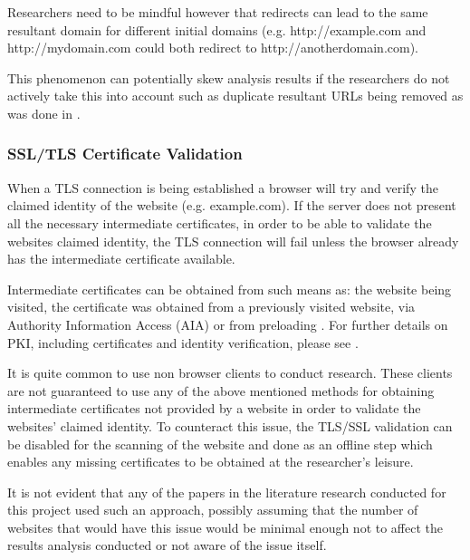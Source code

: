 \documentclass{mscreport}
\begin{document}
\vspace{0.3cm} \noindent
Researchers need to be mindful however that redirects can lead to the same resultant domain for different initial domains (e.g. http://example.com and http://mydomain.com could both redirect to http://anotherdomain.com).

\vspace{0.3cm} \noindent
This phenomenon can potentially skew analysis results if the researchers do not actively take this into account such as duplicate resultant URLs being removed as was done in \cite{Lavrenovs2018-dl}.

\subsubsection{SSL/TLS Certificate Validation}

When a TLS connection is being established a browser will try and verify the claimed identity of the website (e.g. example.com). If the server does not present all the necessary intermediate certificates, in order to be able to validate the websites claimed identity, the TLS connection will fail unless the browser already has the intermediate certificate available.

\vspace{0.3cm} \noindent
Intermediate certificates can be obtained from such means as: the website being visited, the certificate was obtained from a previously visited website, via Authority Information Access (AIA) \cite{Cooper2008-yr} or from preloading \cite{Keeler2020-yj}. For further details on PKI, including certificates and identity verification, please see \cite{Clark2013-sh,Holz2011-yv}.

\vspace{0.3cm} \noindent
It is quite common to use non browser clients to conduct research. These clients are not guaranteed to use any of the above mentioned methods for obtaining intermediate certificates not provided by a website in order to validate the websites' claimed identity. To counteract this issue, the TLS/SSL validation can be disabled for the scanning of the website and done as an offline step which enables any missing certificates to be obtained at the researcher's leisure.

\vspace{0.3cm} \noindent
It is not evident that any of the papers in the literature research conducted for this project used such an approach, possibly assuming that the number of websites that would have this issue would be minimal enough not to affect the results analysis conducted or not aware of the issue itself.
\end{document}

